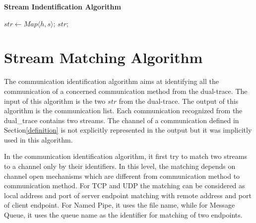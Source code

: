 \begin{algorithm}[H]
\DontPrintSemicolon
\caption{{\bf Stream Indentification Algorithm} \label{endpointIdentAlg}}
$str \leftarrow Map \langle h, s\rangle$;\; 
\KwRet $str$;\;
\end{algorithm} 

\section{Stream Matching Algorithm}\label{streammatch}
The communication identification algorithm aims at identifying all the communication of a concerned communication method from the dual-trace. The input of this algorithm is the two $str$ from the dual-trace. The output of this algorithm is the communication list. Each communication recognized from the dual\_trace contains two streams. The channel of a communication defined in Section\ref{definition} is not explicitly represented in the output but it was implicitly used in this algorithm. 

In the communication identification algorithm, it first try to match two streams to a channel only by their identifiers. In this level, the matching depends on channel open mechanisms which are different from communication method to communication method. For TCP and UDP the matching can be considered as local address and port of server endpoint matching with remote address and port of client endpoint. For Named Pipe, it uses the file name, while for Message Queue, it uses the queue name as the identifier for matching of two endpoints. 

